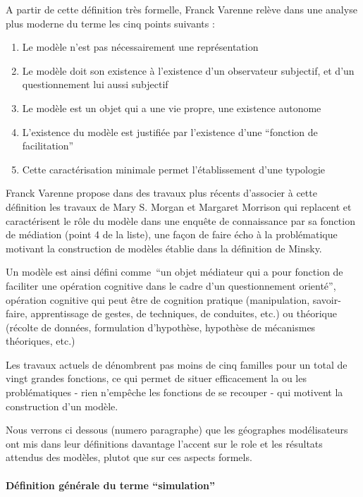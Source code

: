 A partir de cette définition très formelle, Franck Varenne \autocite{Varenne2008} relève dans une analyse plus moderne du terme les cinq points suivants : 
\begin{enumerate}
  \item Le modèle n'est pas nécessairement une représentation
  \item Le modèle doit son existence à l'existence d'un observateur subjectif, et d'un questionnement lui aussi subjectif
  \item Le modèle est un objet qui a une vie propre, une existence autonome
  \item L'existence du modèle est justifiée par l'existence d'une \enquote{fonction de facilitation}
  \item Cette caractérisation minimale permet l'établissement d'une typologie
\end{enumerate}

Franck Varenne propose dans des travaux plus récents \autocite{Varenne2013} d'associer à cette définition les travaux de Mary S. Morgan et Margaret Morrison qui replacent et caractérisent le rôle du modèle dans une enquête de connaissance par sa fonction de médiation (point 4 de la liste), une façon de faire écho à la problématique motivant la construction de modèles établie dans la définition de Minsky.

Un modèle est ainsi défini comme \enquote{un objet médiateur qui a pour fonction de faciliter une opération cognitive dans le cadre d'un questionnement orienté}, opération cognitive qui peut être de cognition pratique (manipulation,  savoir-faire, apprentissage de gestes, de techniques, de conduites, etc.) ou théorique (récolte de données, formulation d'hypothèse, hypothèse de mécanismes théoriques, etc.) \autocite{Varenne2013}

Les travaux actuels de \textcite{Varenne2008, Varenne2013} dénombrent pas moins de cinq familles pour un total de vingt grandes fonctions, ce qui permet de situer efficacement la ou les problématiques - rien n’empêche les fonctions de se recouper - qui motivent la construction d'un modèle. 

Nous verrons ci dessous (numero paragraphe) que les géographes modélisateurs ont mis dans leur définitions davantage l'accent sur le role et les résultats attendus des modèles, plutot que sur ces aspects formels.

\paragraph{Définition générale du terme \enquote{simulation}}

